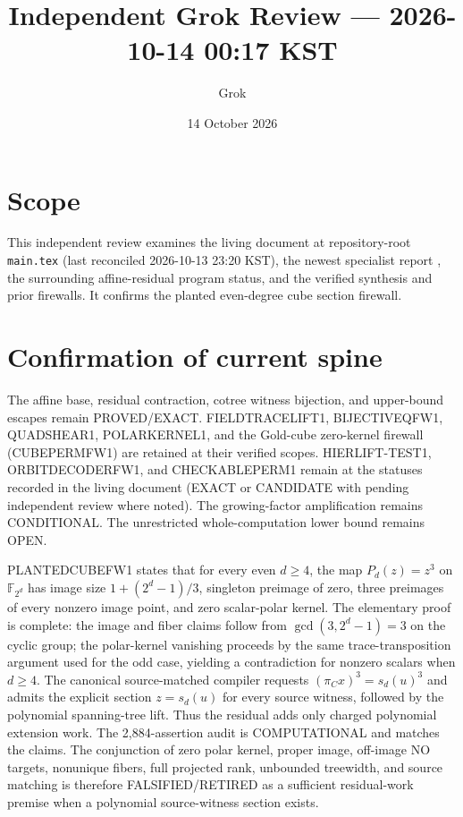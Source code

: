 \documentclass[11pt]{article}
\title{Independent Grok Review --- 2026-10-14 00:17 KST}
\author{Grok}
\date{14 October 2026}
\begin{document}
\maketitle

\begin{center}
\end{center}

\section{Scope}
This independent review examines the living document at repository-root \texttt{main.tex} (last reconciled 2026-10-13 23:20 KST), the newest specialist report , the surrounding affine-residual program status, and the verified synthesis and prior firewalls. It confirms the planted even-degree cube section firewall.

\section{Confirmation of current spine}
The affine base, residual contraction, cotree witness bijection, and upper-bound escapes remain PROVED/EXACT. FIELDTRACELIFT1, BIJECTIVEQFW1, QUADSHEAR1, POLARKERNEL1, and the Gold-cube zero-kernel firewall (CUBEPERMFW1) are retained at their verified scopes. HIERLIFT-TEST1, ORBITDECODERFW1, and CHECKABLEPERM1 remain at the statuses recorded in the living document (EXACT or CANDIDATE with pending independent review where noted). The growing-factor amplification remains CONDITIONAL. The unrestricted whole-computation lower bound remains OPEN.

PLANTEDCUBEFW1 states that for every even \(d\ge 4\), the map \(P_d(z)=z^3\) on \(\mathbb F_{2^d}\) has image size \(1+(2^d-1)/3\), singleton preimage of zero, three preimages of every nonzero image point, and zero scalar-polar kernel. The elementary proof is complete: the image and fiber claims follow from \(\gcd(3,2^d-1)=3\) on the cyclic group; the polar-kernel vanishing proceeds by the same trace-transposition argument used for the odd case, yielding a contradiction for nonzero scalars when \(d\ge 4\). The canonical source-matched compiler requests \((\pi_C x)^3 = s_d(u)^3\) and admits the explicit section \(z=s_d(u)\) for every source witness, followed by the polynomial spanning-tree lift. Thus the residual adds only charged polynomial extension work. The 2,884-assertion audit is COMPUTATIONAL and matches the claims. The conjunction of zero polar kernel, proper image, off-image NO targets, nonunique fibers, full projected rank, unbounded treewidth, and source matching is therefore FALSIFIED/RETIRED as a sufficient residual-work premise when a polynomial source-witness section exists.
\end{document}
